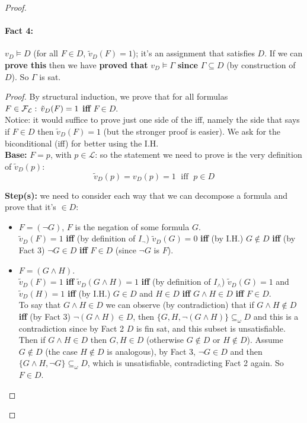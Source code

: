 \documentclass[11pt]{article}
\begin{document}
\begin{proof}
		\paragraph{Fact 4:} $v_D \models D$ (for all $F \in D$, $\tilde{v}_D (F) = 1$); it's an assignment that satisfies $D$. If we can \textbf{prove this} then we have \textbf{proved that} $v_D \models \Gamma$ \textbf{since} $\Gamma \subseteq D$ (by construction of $D$). So $\Gamma$ is sat.\\
		
		\begin{proof}
			By structural induction, we prove that for all formulas $F \in \mathcal{F}_\mathcal{L}: \, \tilde{v}_D (F) = 1$ \textbf{iff} $F \in D$.\\
			
			Notice: it would suffice to prove just one side of the iff, namely the side that says if $F \in D$ then $\tilde{v}_D (F) = 1$ (but the stronger proof is easier). We ask for the biconditional (iff)  for better using the I.H.\\
			
			\textbf{Base:} $F = p$, with $p \in \mathcal{L}$: so the statement we need to prove is the very definition of $\tilde{v}_D (p)$:
			$$\tilde{v}_D (p) = v_D (p) = 1 \; \text{ iff } \; p \in D $$
			
			\textbf{Step(s):} we need to consider each way that we can decompose a formula and prove that it's $\in D$: 
			\begin{itemize}
				\item $F = (\neg G)$, $F$ is the negation of some formula $G$. \\
				$\tilde{v}_D (F) = 1$ \textbf{iff} (by definition of $I_\neg$) $\tilde{v}_D (G) = 0$ \textbf{iff} (by I.H.) $G \notin D$ \textbf{iff} (by Fact 3) $\neg G \in D$ \textbf{iff} $F \in D$ (since $\neg G$ is $F$).\\
				
				\item $F = (G \wedge H)$.\\
				$\tilde{v}_D (F) = 1$ \textbf{iff} $\tilde{v}_D (G \wedge H) = 1$ \textbf{iff} (by definition of $I_\wedge$) $\tilde{v}_D (G) = 1$ and $\tilde{v}_D (H) = 1$ \textbf{iff} (by I.H.) $G \in D$ and $H \in D$ \textbf{iff} $G \wedge H \in D$ \textbf{iff} $F \in D$.\\
				To say that $G \wedge H \in D$ we can observe (by contradiction) that if $G \wedge H \notin D$ \textbf{iff} (by Fact 3) $\neg (G \wedge H) \in D$, then $\{G,H, \neg (G \wedge H)\} \subseteq_\omega D$ and this is a contradiction since by Fact 2 $D$ is fin sat, and this subset is unsatisfiable.\\
				Then if $G \wedge H \in D$ then $G,H \in D$ (otherwise $G \notin D$ or $H \notin D$). Assume $G \notin D$ (the case $H \notin D$ is analogous), by Fact 3, $\neg G \in D$ and then $\{G \wedge H, \neg G\} \subseteq_\omega D$, which is unsatisfiable, contradicting Fact 2 again. So $F \in D$.\\
				

\end{itemize}
\end{proof}
\end{proof}
\end{document}
